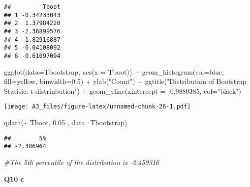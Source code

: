 \documentclass[
]{article}
\newenvironment{Shaded}{\begin{snugshade}}{\end{snugshade}}
\newcommand{\AttributeTok}[1]{\textcolor[rgb]{0.77,0.63,0.00}{#1}}
\newcommand{\CommentTok}[1]{\textcolor[rgb]{0.56,0.35,0.01}{\textit{#1}}}
\newcommand{\FloatTok}[1]{\textcolor[rgb]{0.00,0.00,0.81}{#1}}
\newcommand{\FunctionTok}[1]{\textcolor[rgb]{0.00,0.00,0.00}{#1}}
\newcommand{\NormalTok}[1]{#1}
\newcommand{\SpecialCharTok}[1]{\textcolor[rgb]{0.00,0.00,0.00}{#1}}
\newcommand{\StringTok}[1]{\textcolor[rgb]{0.31,0.60,0.02}{#1}}
\begin{document}
\begin{verbatim}
##         Tboot
## 1 -0.34233043
## 2  1.37984220
## 3 -2.36899576
## 4 -1.82916887
## 5 -0.04108092
## 6 -0.61097094
\end{verbatim}

\begin{Shaded}
\begin{Highlighting}[]
\FunctionTok{ggplot}\NormalTok{(}\AttributeTok{data=}\NormalTok{Tbootstrap, }\FunctionTok{aes}\NormalTok{(}\AttributeTok{x =}\NormalTok{ Tboot)) }\SpecialCharTok{+} \FunctionTok{geom\_histogram}\NormalTok{(}\AttributeTok{col=}\StringTok{\textquotesingle{}blue\textquotesingle{}}\NormalTok{, }\AttributeTok{fill=}\StringTok{\textquotesingle{}yellow\textquotesingle{}}\NormalTok{, }\AttributeTok{binwidth=}\FloatTok{0.5}\NormalTok{) }\SpecialCharTok{+} \FunctionTok{ylab}\NormalTok{(}\StringTok{"Count"}\NormalTok{) }\SpecialCharTok{+} \FunctionTok{ggtitle}\NormalTok{(}\StringTok{"Distribution of Bootstrap Statisic:  t{-}distriubution"}\NormalTok{) }\SpecialCharTok{+} \FunctionTok{geom\_vline}\NormalTok{(}\AttributeTok{xintercept =} \SpecialCharTok{{-}}\FloatTok{0.9880385}\NormalTok{, }\AttributeTok{col=}\StringTok{"black"}\NormalTok{)}
\end{Highlighting}
\end{Shaded}

\texttt{[image: A3\_files/figure-latex/unnamed-chunk-26-1.pdf]}

\begin{Shaded}
\begin{Highlighting}[]
\FunctionTok{qdata}\NormalTok{(}\SpecialCharTok{\textasciitilde{}}\NormalTok{ Tboot, }\FloatTok{0.05}\NormalTok{ , }\AttributeTok{data=}\NormalTok{Tbootstrap)}
\end{Highlighting}
\end{Shaded}

\begin{verbatim}
##        5% 
## -2.386964
\end{verbatim}

\begin{Shaded}
\begin{Highlighting}[]
\CommentTok{\#The  5th percentile of the distribution is {-}2.459316 }
\end{Highlighting}
\end{Shaded}

\textbf{Q10 c}
\end{document}

